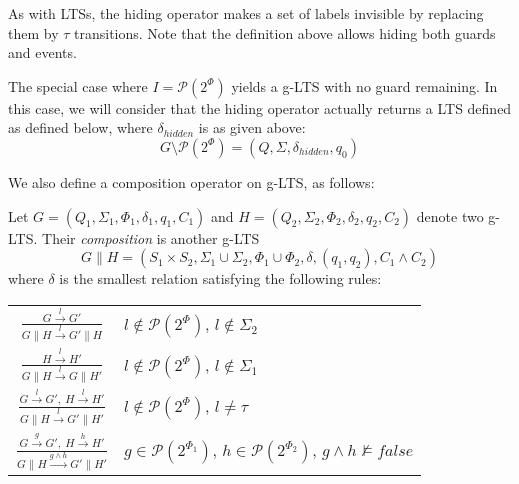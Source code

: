 As with LTSs, the hiding operator makes a set of labels invisible by replacing them by $\tau$ transitions. Note that the definition above allows hiding both guards and events. 

The special case where $I = \mathcal{P}(2^\Phi)$ yields a g-LTS with no guard remaining. In this case, we will consider that the hiding operator actually returns a LTS defined as defined below, where $\delta_{hidden}$ is as given above:
\begin{equation*}
G \setminus \mathcal{P}(2^\Phi) = (Q,\Sigma,\delta_{hidden},q_0)
\end{equation*}

\noindent We also define a composition operator on g-LTS, as follows:

\begin{definition}
Let $G = (Q_1,\Sigma_1,\Phi_1,\delta_1,q_{1},C_{1})$ and $H = (Q_2,\Sigma_2,\Phi_2,\delta_2,q_{2},C_{2})$ denote two g-LTS. Their \emph{composition} is another g-LTS 
\begin{equation*}
G \parallel H = (S_1 \times S_2,\Sigma_1\cup\Sigma_2,\Phi_1\cup\Phi_2,\delta,(q_1,q_2),C_1 \wedge C_2)
\end{equation*}
\noindent where $\delta$ is the smallest relation satisfying the following rules:

\centering
\begin{tabular}{cl}
$\frac{\displaystyle G \stackrel{l}{\longrightarrow} G'}{\displaystyle G \parallel H \stackrel{l}{\longrightarrow} G' \parallel H}$ & $l \notin \mathcal{P}(2^\Phi)$, $l \notin \Sigma_2$ \\[20pt]

$\frac{\displaystyle H \stackrel{l}{\longrightarrow} H'}{\displaystyle G \parallel H \stackrel{l}{\longrightarrow} G \parallel H'}$ & $l \notin \mathcal{P}(2^\Phi)$, $l \notin \Sigma_1$ \\[20pt]

$\frac{\displaystyle G \stackrel{l}{\longrightarrow} G',~H \stackrel{l}{\longrightarrow} H'}{\displaystyle G \parallel H \stackrel{l}{\longrightarrow} G' \parallel H'}$ & $l \notin \mathcal{P}(2^\Phi)$, $l \neq \tau$ \\[20pt]

$\frac{\displaystyle G \stackrel{g}{\longrightarrow} G',~H \stackrel{h}{\longrightarrow} H'}{\displaystyle G \parallel H \stackrel{g \wedge h}{\longrightarrow} G' \parallel H'}$ & $g \in \mathcal{P}(2^{\Phi_1})$, $h \in \mathcal{P}(2^{\Phi_2})$, $g \wedge h \nvDash false$ 
\end{tabular}
\end{definition}

